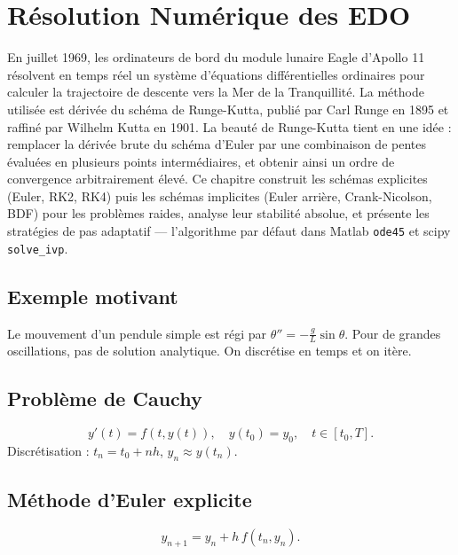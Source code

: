 \chapter{R\'esolution Num\'erique des EDO}
\label{ch:edo}

En juillet 1969, les ordinateurs de bord du module lunaire Eagle d'Apollo 11 résolvent en temps réel un système d'équations différentielles ordinaires pour calculer la trajectoire de descente vers la Mer de la Tranquillité. La méthode utilisée est dérivée du schéma de Runge-Kutta, publié par Carl Runge en 1895 et raffiné par Wilhelm Kutta en 1901. La beauté de Runge-Kutta tient en une idée : remplacer la dérivée brute du schéma d'Euler par une combinaison de pentes évaluées en plusieurs points intermédiaires, et obtenir ainsi un ordre de convergence arbitrairement élevé. Ce chapitre construit les schémas explicites (Euler, RK2, RK4) puis les schémas implicites (Euler arrière, Crank-Nicolson, BDF) pour les problèmes raides, analyse leur stabilité absolue, et présente les stratégies de pas adaptatif --- l'algorithme par défaut dans Matlab \texttt{ode45} et scipy \texttt{solve\_ivp}.

\section{Exemple motivant}
Le mouvement d'un pendule simple est r\'egi par $\theta''=-\frac{g}{L}\sin\theta$. Pour de grandes oscillations, pas de solution analytique. On discr\'etise en temps et on it\`ere.

\section{Probl\`eme de Cauchy}

\begin{definition}
\[
y'(t) = f(t,y(t)), \quad y(t_0)=y_0, \quad t\in[t_0,T].
\]
Discr\'etisation : $t_n=t_0+nh$, $y_n\approx y(t_n)$.
\end{definition}

\section{M\'ethode d'Euler explicite}

\begin{definition}
\[
y_{n+1} = y_n + h\,f(t_n,y_n).
\]
\end{definition}

